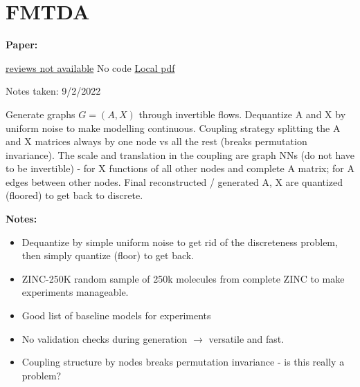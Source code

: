 \clearpage

\section{FMTDA}\label{sec:FMTDA}

\begin{notebox}
\textbf{Paper: } 
\vspace{5pt}

\href{https://openaccess.thecvf.com/content/WACV2022/html/Yao_Federated_Multi-Target_Domain_Adaptation_WACV_2022_paper.html}{reviews not available}
\hspace{1cm}
{No code}
\hspace{1cm}
\href{run:/home/magda/Dropbox/Zot/Yao et al_2022_Federated multi-target domain adaptation.pdf}{Local pdf}

\hfill Notes taken: 9/2/2022 
\end{notebox}

\begin{notebox}[colback=red!5]
\tldr Generate graphs $G = (A, X)$ through invertible flows. Dequantize A and X by uniform noise to make modelling continuous. Coupling strategy splitting the A and X matrices always by one node vs all the rest (breaks permutation invariance). The scale and translation in the coupling are graph NNs (do not have to be invertible) - for X functions of all other nodes and complete A matrix; for A edges between other nodes. Final reconstructed / generated A, X are quantized (floored) to get back to discrete.
\end{notebox}

\begin{notebox}[colback=yellow!5]
\textbf{Notes:} 
\begin{itemize}[nosep]
\item Dequantize by simple uniform noise to get rid of the discreteness problem, then simply quantize (floor) to get back.
\item ZINC-250K random sample of 250k molecules from complete ZINC to make experiments manageable. 
\item Good list of baseline models for experiments
\item No validation checks during generation $\to$ versatile and fast.
\item Coupling structure by nodes breaks permutation invariance - is this really a problem?
\end{itemize}
\end{notebox}

